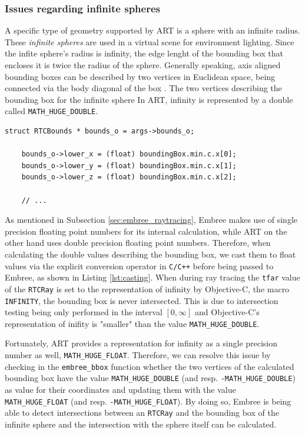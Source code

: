 \subsubsection{Issues regarding infinite spheres}

A specific type of geometry supported by ART is a sphere with an infinite radius. These \emph{infinite spheres} are used in a virtual scene for environment lighting.
Since the infite sphere's radius is infinity, the edge lenght of the bounding box that encloses it is twice the radius of the sphere. Generally speaking, axis aligned bounding boxes can be described by two vertices in Euclidean space, being connected via the body diagonal of the box . The two vertices describing the bounding box for the infinite sphere  In ART, infinity is represented by a double called \texttt{MATH\_HUGE\_DOUBLE}.

\begin{listing} 
	\begin{lstlisting}[caption={Casting of a double precision floating point number to a single precision floating point number by explicit conversion.}, label={lst:casting}]
	struct RTCBounds * bounds_o = args->bounds_o;
	
	bounds_o->lower_x = (float) boundingBox.min.c.x[0];
	bounds_o->lower_y = (float) boundingBox.min.c.x[1];
	bounds_o->lower_z = (float) boundingBox.min.c.x[2];
	
	// ...
	\end{lstlisting}
\end{listing}

As mentioned in Subsection \ref{sec:embree_raytracing}, Embree makes use of single precision floating point numbers for its internal calculation, while ART on the other hand uses double precision floating point numbers. Therefore, when calculating the double values describing the bounding box, we cast them to float values via the explicit conversion operator in \texttt{C/C++} before being passed to Embree, as shown in Listing \ref{lst:casting}.  
When during ray tracing the \texttt{tfar} value of the \texttt{RTCRay} is set to the representation of infinity by Objective-C, the macro \texttt{INFINITY}, the bounding box is never intersected. This is due to intersection testing being only performed in the interval $[0,\infty]$ and Objective-C's representation of inifity is "smaller" than the value \texttt{MATH\_HUGE\_DOUBLE}. 

Fortunately, ART provides a representation for infinity as a single precision number as well, \texttt{MATH\_HUGE\_FLOAT}. Therefore, we can resolve this issue by checking in the \texttt{embree\_bbox} function whether the two vertices of the calculated bounding box have the value \texttt{MATH\_HUGE\_DOUBLE} (and resp. \texttt{-MATH\_HUGE\_DOUBLE}) as value for their coordinates and updating them with the value \texttt{MATH\_HUGE\_FLOAT} (and resp. \texttt{-MATH\_HUGE\_FLOAT}). By doing so, Embree is being able to detect intersections between an \texttt{RTCRay} and the bounding box of the infinite sphere and the intersection with the sphere itself can be calculated.

